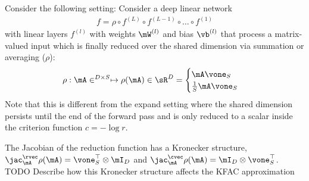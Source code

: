 Consider the following setting: Consider a deep linear network
\begin{align*}
  f = \rho \circ f^{(L)} \circ f^{(L-1)} \circ \ldots \circ f^{(1)}
\end{align*}
with linear layers $f^{(l)}$ with weights $\mW^{(l)}$ and bias $\vb^{(l)}$ that process a matrix-valued input which is finally reduced over the shared dimension via summation or averaging ($\rho$):
\begin{align*}
  \rho: \mA \in^{D \times S}
  \mapsto
  \rho(\mA)
  \in \sR^D
  =
  \begin{cases}
    \mA \vone_S
    \\
    \frac{1}{S} \mA \vone_S
  \end{cases}
\end{align*}
Note that this is different from the expand setting where the shared dimension persists until the end of the forward pass and is only reduced to a scalar inside the criterion function $c = - \log r$.

The Jacobian of the reduction function has a Kronecker structure,
$\jac_{\mA}^{\rvec}\rho(\mA) = \vone_S^{\top} \otimes \mI_D$ and $\jac_{\mA}^{\cvec}\rho(\mA) = \mI_D \otimes \vone_S^{\top}$.
TODO Describe how this Kronecker structure affects the KFAC approximation


